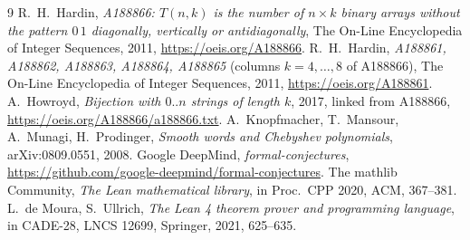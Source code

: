 \documentclass[11pt]{article}
\theoremstyle{remark}\newtheorem{remark}[theorem]{Remark}
\begin{document}
\begin{thebibliography}{9}
 R.~H.~Hardin, \emph{A188866: $T(n,k)$ is the number of $n\times k$ binary arrays without the pattern $0\,1$ diagonally, vertically or antidiagonally}, The On-Line Encyclopedia of Integer Sequences, 2011, \url{https://oeis.org/A188866}.
 R.~H.~Hardin, \emph{A188861, A188862, A188863, A188864, A188865} (columns $k=4,\dots,8$ of A188866), The On-Line Encyclopedia of Integer Sequences, 2011, \url{https://oeis.org/A188861}.
 A.~Howroyd, \emph{Bijection with $0..n$ strings of length $k$}, 2017, linked from A188866, \url{https://oeis.org/A188866/a188866.txt}.
 A.~Knopfmacher, T.~Mansour, A.~Munagi, H.~Prodinger, \emph{Smooth words and Chebyshev polynomials}, arXiv:0809.0551, 2008.
 Google DeepMind, \emph{formal-conjectures}, \url{https://github.com/google-deepmind/formal-conjectures}.
 The mathlib Community, \emph{The Lean mathematical library}, in Proc.\ CPP 2020, ACM, 367--381.
 L.~de Moura, S.~Ullrich, \emph{The Lean 4 theorem prover and programming language}, in CADE-28, LNCS 12699, Springer, 2021, 625--635.
\end{thebibliography}
\end{document}
